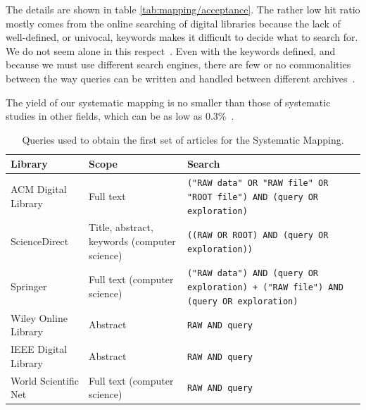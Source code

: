 
The details are shown in table \ref{tab:mapping/acceptance}. The rather low hit ratio
mostly comes from the online searching of digital libraries
because the lack of well-defined, or univocal, keywords makes it difficult to decide 
what to search for. We do not seem alone in this respect~\cite{Kitchenham2013,Jorgensen2007}.
Even with the keywords defined, and because we must use different search engines, there are
few or no commonalities between the way queries can be written and handled
between different archives~\cite{Bailey2007, Brereton2007}.

The yield of our systematic mapping is no smaller than those of systematic studies in
other fields, which can be as low as 0.3\%~\cite{Oakley2003}.

\begin{table}[hptb]
  \small
  \begin{tabularx}{\textwidth}{l X X} \hline
    \textbf{Library} & \textbf{Scope} & \textbf{Search} \\ \hline
    ACM Digital Library & Full text & \texttt{("RAW data" OR "RAW file" OR "ROOT file") AND (query OR exploration)} \\
    ScienceDirect & Title, abstract, keywords (computer science) & \texttt{((RAW OR ROOT) AND (query OR exploration))} \\
    Springer & Full text (computer science) & \texttt{("RAW data") AND (query OR exploration) + ("RAW file") AND (query OR exploration)} \\
    Wiley Online Library & Abstract & \texttt{RAW AND query} \\
    IEEE Digital Library & Abstract & \texttt{RAW AND query} \\
    World Scientific Net & Full text (computer science) & \texttt{RAW AND query} \\
  \end{tabularx}
  \caption{Queries used to obtain the first set of articles for the Systematic Mapping.}\label{tab:mapping/searches}
\end{table}

